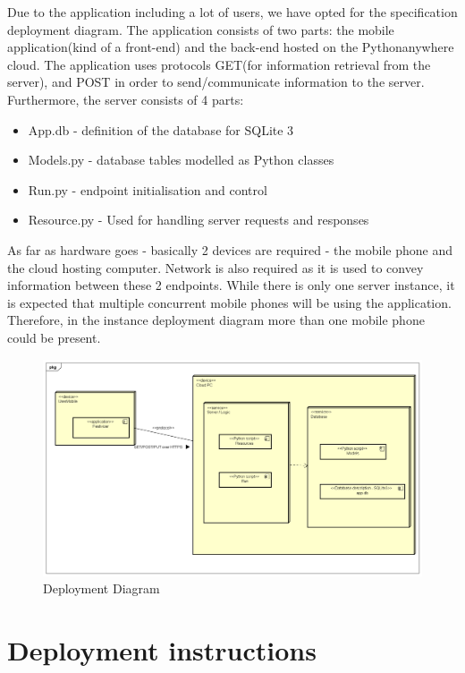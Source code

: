 			Due to the application including a lot of users, we have opted for the specification deployment diagram.
			The application consists of two parts: the mobile application(kind of a front-end) and the back-end hosted on the Pythonanywhere cloud. The application uses protocols GET(for information retrieval from the server), and POST in order to send/communicate information to the server. Furthermore, the server consists of 4 parts:
			\begin{itemize}
				\item App.db - definition of the database for SQLite 3
				\item Models.py - database tables modelled as Python classes
				\item Run.py - endpoint initialisation and control
				\item Resource.py - Used for handling server requests and responses
			\end{itemize}
			
			As far as hardware goes - basically 2 devices are required - the mobile phone and the cloud hosting computer. Network is also required as it is used to convey
			information between these 2 endpoints. While there is only one server instance, it is expected that multiple concurrent mobile phones will be using the application. Therefore, in the instance deployment diagram more than one mobile phone could be present.
		
			\begin{figure}[H]
				\includegraphics[width=\linewidth]{diagrams/Deployment Diagram0.png}
				\caption{Deployment Diagram}
				\label{fig:deployment_diag}
			\end{figure}
		
			\eject			
		\section{Deployment instructions}
			
